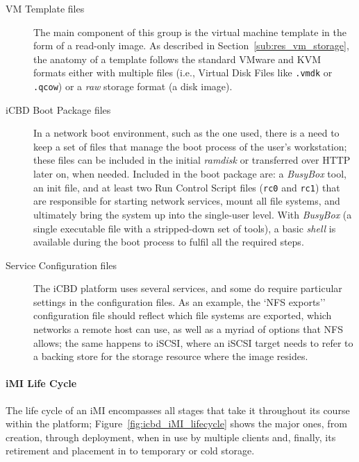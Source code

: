 \begin{description}
	\item [VM Template files] The main component of this group is the virtual machine template in the form of a read-only image. As described in Section~\ref{sub:res_vm_storage}, the anatomy of a template follows the standard VMware and KVM formats either with multiple files (i.e., Virtual Disk Files like \texttt{.vmdk} or \texttt{.qcow}) or a \textit{raw} storage format (a disk image).
	\item [iCBD Boot Package files] In a network boot environment, such as the one used, there is a need to keep a set of files that manage the boot process of the user’s workstation; these files can be included in the initial \textit{ramdisk} or transferred over HTTP later on, when needed. Included in the boot package are: a \textit{BusyBox} tool, an init file, and at least two Run Control Script files (\texttt{rc0} and \texttt{rc1}) that are responsible for starting network services, mount all file systems, and ultimately bring the system up into the single-user level. With \textit{BusyBox} (a single executable file with a stripped-down set of tools), a basic \textit{shell} is available during the boot process to fulfil all the required steps.
	\item [Service Configuration files] The iCBD platform uses several services, and some do require particular settings in the configuration files. As an example, the `NFS exports'' configuration file should reflect which file systems are exported, which networks a remote host can use, as well as a myriad of options that NFS allows; the same happens to iSCSI, where an iSCSI target needs to refer to a backing store for the storage resource where the image resides. 
\end{description}

\paragraph{iMI Life Cycle}
\label{subsub:icbd_imi_lifecycle}

The life cycle of an iMI encompasses all stages that take it throughout its course within the platform; Figure~\ref{fig:icbd_iMI_lifecycle} shows the major ones, from creation, through deployment, when in use by multiple clients and, finally, its retirement and placement in to temporary or cold storage.


